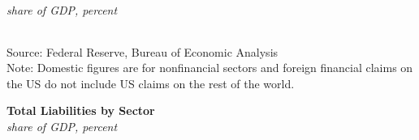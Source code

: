 \documentclass{report}
\newcommand{\tbllink}[1]{\href{https://raw.githubusercontent.com/bdecon/US-chartbook/master/chartbook/data/#1}{\faTable}}
\begin{document}
{\begin{minipage}{0.76\textwidth}
\footnotesize{\textit{share of GDP, percent}
\vspace*{-5mm}

 \setlength{\tabcolsep}{3.0pt} \color{black!90}
{\renewcommand{\arraystretch}{1.5}
\hspace*{-1mm} \begin{tabular}{p{37.6mm} R{11.4mm} R{11.2mm} R{11.2mm} R{11.2mm} R{10.7mm} R{10.2mm}}
		 \hline
	\end{tabular}}}
\vspace{-1mm}

\footnotesize{Source: Federal Reserve, Bureau of Economic Analysis}  \hfill \tbllink{liabsh.csv} \ \tbllink{liabpc.csv}\\
\footnotesize{Note: Domestic figures are for nonfinancial sectors and foreign financial claims on the US do not include US claims on the rest of the world.}
\end{minipage}
\newpage
\begin{minipage}{0.76\textwidth}
\small 
\end{minipage}

\begin{minipage}{0.35\textwidth} 
\normalsize \textbf{Total Liabilities by Sector}\\
\footnotesize{\textit{share of GDP, percent}}
\vspace{4.6cm}


\end{minipage}}
\end{document}
